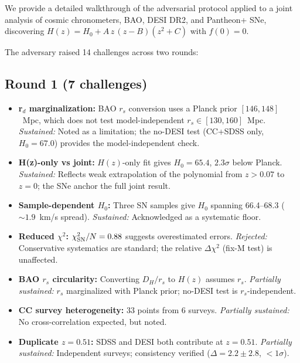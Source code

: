 \documentclass[twocolumn]{aastex631}
\begin{document}
We provide a detailed walkthrough of the adversarial protocol applied to a
joint analysis of cosmic chronometers, BAO, DESI DR2, and Pantheon+ SNe,
discovering $H(z) = H_0 + A\,z\,(z-B)(z^2+C)$ with $f(0)=0$.

The adversary raised 14 challenges across two rounds:

\subsection*{Round 1 (7 challenges)}
\begin{itemize}
  \item \textbf{r$_d$ marginalization:} BAO $r_s$ conversion uses a
        Planck prior $[146,148]$~Mpc, which does not test model-independent
        $r_s\in[130,160]$~Mpc.  \emph{Sustained:} Noted as a limitation;
        the no-DESI test (CC+SDSS only, $H_0=67.0$) provides the
        model-independent check.
  \item \textbf{H(z)-only vs joint:} $H(z)$-only fit gives $H_0=65.4$,
        $2.3\sigma$ below Planck.  \emph{Sustained:} Reflects weak
        extrapolation of the polynomial from $z>0.07$ to $z=0$; the
        SNe anchor the full joint result.
  \item \textbf{Sample-dependent $H_0$:} Three SN samples give $H_0$
        spanning 66.4--68.3 ($\sim1.9$~km/s spread).  \emph{Sustained:}
        Acknowledged as a systematic floor.
  \item \textbf{Reduced $\chi^2$:} $\chi^2_{\rm SN}/N=0.88$ suggests
        overestimated errors.  \emph{Rejected:} Conservative systematics
        are standard; the relative $\Delta\chi^2$ (fix-M test) is
        unaffected.
  \item \textbf{BAO $r_s$ circularity:} Converting $D_H/r_s$ to $H(z)$
        assumes $r_s$.  \emph{Partially sustained:} $r_s$ marginalized
        with Planck prior; no-DESI test is $r_s$-independent.
  \item \textbf{CC survey heterogeneity:} 33 points from 6 surveys.
        \emph{Partially sustained:} No cross-correlation expected,
        but noted.
  \item \textbf{Duplicate $z=0.51$:} SDSS and DESI both contribute at
        $z=0.51$.  \emph{Partially sustained:} Independent surveys;
        consistency verified ($\Delta=2.2\pm2.8$, $<1\sigma$).
\end{itemize}
\end{document}
